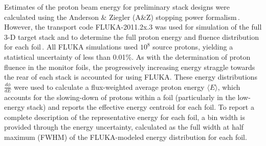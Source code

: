 Estimates of the proton beam energy for preliminary stack designs were calculated using the Anderson \& Ziegler (A\&Z) stopping power formalism\,\cite{Andersen_Ziegler_1977,Ziegler1985,Ziegler1999}.
However, the 
transport code FLUKA-2011.2x.3 was used for simulation of the full 3-D target stack and to determine the full proton energy and fluence distribution for each foil\,\cite{Bohlen2014a}. 
All FLUKA simulations used $10^8$ source protons, 
yielding a statistical uncertainty 
of less than 0.01\%.
As with the determination of proton fluence in the monitor foils, the progressively increasing energy straggle towards the rear of each stack is accounted for using 
FLUKA.
These energy distributions $\frac{d\phi}{dE}$ were used to calculate a flux-weighted average proton  energy $\langle E \rangle$, which accounts for the slowing-down of protons within a foil (particularly in the low-energy stack) and reports the effective  energy centroid for each foil.
To report a complete description of the representative energy for each foil, a bin width is provided through the  energy uncertainty, calculated as the full width at half maximum (FWHM) of the FLUKA-modeled energy distribution for each foil.


